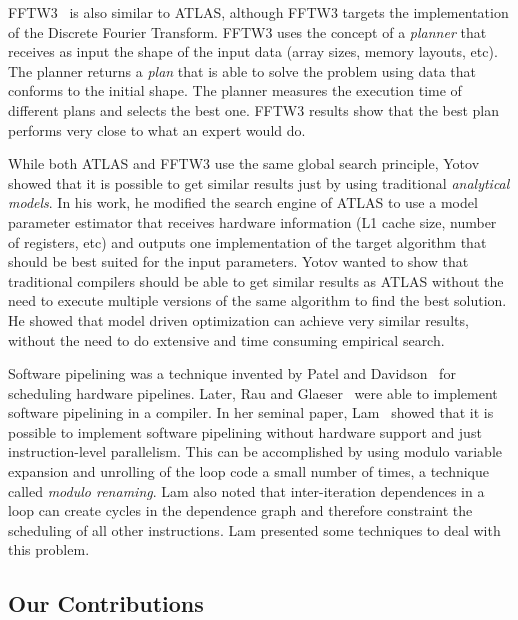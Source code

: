 \documentclass[10pt]{article}
\begin{document}
FFTW3~\cite{Frigo05thedesign} is also similar to ATLAS, although FFTW3 targets the implementation of the Discrete Fourier Transform.
FFTW3 uses the concept of a \emph{planner} that receives as input the shape of the input data (array sizes, memory layouts, etc).
The planner returns a \emph{plan} that is able to solve the problem using data that conforms to the initial shape. The planner measures
the execution time of different plans and selects the best one. FFTW3 results show that the best plan performs very close
to what an expert would do.

While both ATLAS and FFTW3 use the same global search principle, Yotov~\cite{Yotov05issearch} showed that it is possible to get
similar results just by using traditional \emph{analytical models}. In his work, he modified the search engine of ATLAS to use
a model parameter estimator that receives hardware information (L1 cache size, number of registers, etc) and outputs
one implementation of the target algorithm that should be best suited for the input parameters. Yotov wanted to show that
traditional compilers should be able to get similar results as ATLAS without the need to execute multiple versions of the same
algorithm to find the best solution. He showed that model driven optimization can achieve very similar results, without the need
to do extensive and time consuming empirical search.

Software pipelining was a technique invented by Patel and Davidson~\cite{Patel:76} for scheduling hardware pipelines.
Later, Rau and Glaeser~\cite{Rau:81} were able to implement software pipelining in a compiler. In her seminal paper,
Lam~\cite{Lam:88} showed that it is possible to implement
software pipelining without hardware support and just instruction-level parallelism. This can be accomplished by using modulo variable
expansion and unrolling of the loop code a small number of times, a technique called \emph{modulo renaming}.
Lam also noted that inter-iteration dependences in a loop can create cycles in the dependence graph and therefore constraint the
scheduling of all other instructions. Lam presented some techniques to deal with this problem.

\subsection{Our Contributions}
\end{document}
